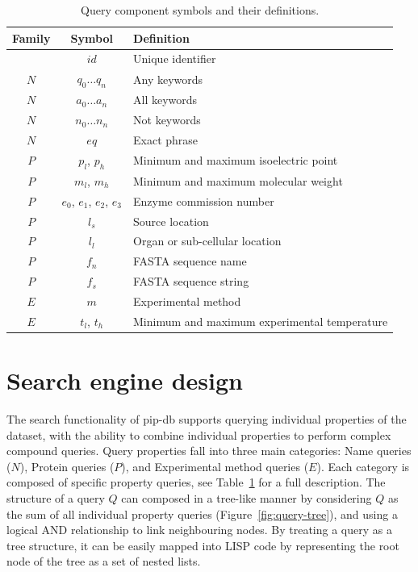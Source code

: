 \begin{table}[H]
\centering
\begin{tabular}{| c | c | l |}
\hline
\textbf{Family} & \textbf{Symbol} & \textbf{Definition}\\
\hline
& $id$ & Unique identifier\\
$N$ & $q_0 \ldots q_n$ & Any keywords\\
$N$ & $a_0 \ldots a_n$ & All keywords\\
$N$ & $n_0 \ldots n_n$ & Not keywords\\
$N$ & $eq$ & Exact phrase\\
$P$ & $p_l$, $p_h$ & Minimum and maximum isoelectric point\\
$P$ & $m_l$, $m_h$ & Minimum and maximum molecular weight\\
$P$ & $e_0$, $e_1$, $e_2$, $e_3$ & Enzyme commission number\\
$P$ & $l_s$ & Source location\\
$P$ & $l_l$ & Organ or sub-cellular location\\
$P$ & $f_n$ & FASTA sequence name\\
$P$ & $f_s$ & FASTA sequence string\\
$E$ & $m$ & Experimental method\\
$E$ & $t_l$, $t_h$ & Minimum and maximum experimental temperature\\
\hline
\end{tabular}
\caption[Query component symbols and their definitions]{Query component symbols and their definitions.}
\label{tab:query-components}
\end{table}


\newpage
\section{Search engine design}\label{sec:search-engine}

The search functionality of pip-db supports querying individual
properties of the dataset, with the ability to combine individual
properties to perform complex compound queries. Query properties fall
into three main categories: Name queries ($N$), Protein queries ($P$),
and Experimental method queries ($E$). Each category is composed of
specific property queries, see Table~\ref{tab:query-components} for a
full description. The structure of a query $Q$ can composed in a
tree-like manner by considering $Q$ as the sum of all individual
property queries (Figure~\ref{fig:query-tree}), and using a logical
AND relationship to link neighbouring nodes. By treating a query as a
tree structure, it can be easily mapped into LISP code by representing
the root node of the tree as a set of nested
lists.

